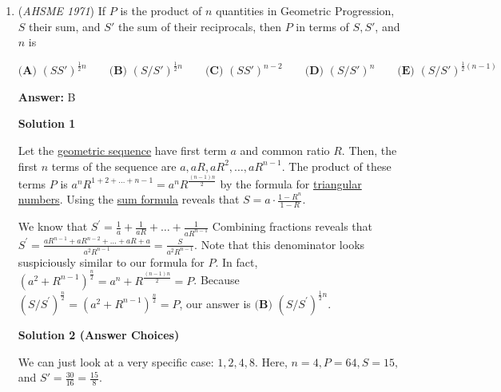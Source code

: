 \begin{enumerate}
 



\textbf{Solution 2 (50-50 guess)}

For any two reals $a$ and $x$ with $a>0$, $a^x>0$. Thus, we know that all of the terms $2^{-\frac1x}>0$, so $s$ is the product of $5$ real terms greater than $1$. Thus, $s>1$, so we can eliminate options (C), (D), and (E). Now, we have a $50$\% chance of guessing the right answer, $\boxed{\textbf{(A) }\frac12(1+2^{-\frac1{32}})^{-1}}$.

 


	\item (\textit{AHSME 1971}) If $P$ is the product of $n$ quantities in Geometric Progression, $S$ their sum, and $S'$ the sum of their reciprocals, 
then $P$ in terms of $S, S'$, and $n$ is


 $\textbf{(A) }(SS')^{\frac{1}{2}n}\qquad \textbf{(B) }(S/S')^{\frac{1}{2}n}\qquad \textbf{(C) }(SS')^{n-2}\qquad \textbf{(D) }(S/S')^n\qquad \textbf{(E) }(S/S')^{\frac{1}{2}(n-1)}$

 \textbf{Answer: }B



\textbf{Solution 1}

Let the \href{https://artofproblemsolving.com/wiki/index.php?title=Geometric\_sequence}{geometric sequence} have first term $a$ and common ratio $R$. Then, the first $n$ terms of the sequence are $a,aR,aR^2,\ldots,aR^{n-1}$. The product of these terms $P$ is $a^nR^{1+2+\ldots+n-1}=a^nR^{\frac{(n-1)n}2}$ by the formula for \href{https://artofproblemsolving.com/wiki/index.php?title=Triangular\_numbers}{triangular numbers}. Using the \href{https://artofproblemsolving.com/wiki/index.php?title=Geometric\_sequence\#Sum}{sum formula} reveals that $S=a\cdot\frac{1-R^n}{1-R}$.

 We know that $S^{\prime}=\frac1a+\frac1{aR}+\ldots+\frac1{aR^{n-1}}$ Combining fractions reveals that $S^{\prime}=\frac{aR^{n-1}+aR^{n-2}+\ldots+aR+a}{a^2R^{n-1}}=\frac S{a^2R^{n-1}}$. Note that this denominator looks suspiciously similar to our formula for $P$. In fact, $(a^2+R^{n-1})^{\frac n2}=a^n+R^{\frac{(n-1)n}2}=P$. Because $(S/S^{\prime})^{\frac n2}=(a^2+R^{n-1})^{\frac n2}=P$, our answer is $\boxed{\textbf{(B) }(S/S^{\prime})^{\frac 12n}}$.

 



\textbf{Solution 2 (Answer Choices)}

We can just look at a very specific case: $1, 2, 4, 8.$ Here, $n=4, P=64, S=15,$ and $S'=\frac{30}{16}=\frac{15}{8}.$


\end{enumerate}
